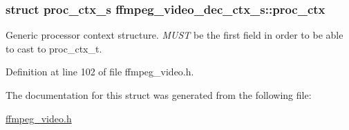 \subsubsection[{\texorpdfstring{proc\+\_\+ctx}{proc_ctx}}]{\setlength{\rightskip}{0pt plus 5cm}struct {\bf proc\+\_\+ctx\+\_\+s} ffmpeg\+\_\+video\+\_\+dec\+\_\+ctx\+\_\+s\+::proc\+\_\+ctx}\hypertarget{structffmpeg__video__dec__ctx__s_a9c234e383747ab90b5efd066e0773f1f}{}\label{structffmpeg__video__dec__ctx__s_a9c234e383747ab90b5efd066e0773f1f}
Generic processor context structure. {\itshape M\+U\+ST} be the first field in order to be able to cast to proc\+\_\+ctx\+\_\+t. 

Definition at line 102 of file ffmpeg\+\_\+video.\+h.



The documentation for this struct was generated from the following file\+:\begin{DoxyCompactItemize}
\item 
\hyperlink{ffmpeg__video_8h}{ffmpeg\+\_\+video.\+h}\end{DoxyCompactItemize}

